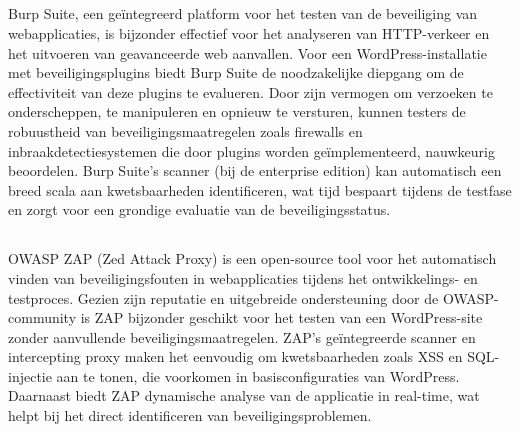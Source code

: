 \subsection{}
Burp Suite, een geïntegreerd platform voor het testen van de beveiliging van webapplicaties, is 
bijzonder effectief voor het analyseren van HTTP-verkeer en het uitvoeren van geavanceerde web 
aanvallen. Voor een WordPress-installatie met beveiligingsplugins biedt Burp Suite de noodzakelijke 
diepgang om de effectiviteit van deze plugins te evalueren. Door zijn vermogen om verzoeken te 
onderscheppen, te manipuleren en opnieuw te versturen, kunnen testers de robuustheid van 
beveiligingsmaatregelen zoals firewalls en inbraakdetectiesystemen die door plugins worden 
geïmplementeerd, nauwkeurig beoordelen. Burp Suite's scanner (bij de enterprise edition) kan automatisch een breed scala 
aan kwetsbaarheden identificeren, wat tijd bespaart tijdens de testfase en zorgt voor een 
grondige evaluatie van de beveiligingsstatus.

\subsection{}
OWASP ZAP (Zed Attack Proxy) is een open-source tool voor het automatisch vinden van beveiligingsfouten 
in webapplicaties tijdens het ontwikkelings- en testproces. Gezien zijn reputatie en uitgebreide 
ondersteuning door de OWASP-community is ZAP bijzonder geschikt voor het testen van een 
WordPress-site zonder aanvullende beveiligingsmaatregelen. ZAP's geïntegreerde scanner en 
intercepting proxy maken het eenvoudig om kwetsbaarheden zoals XSS en SQL-injectie aan te 
tonen, die voorkomen in basisconfiguraties van WordPress. Daarnaast biedt ZAP dynamische 
analyse van de applicatie in real-time, wat helpt bij het direct identificeren van beveiligingsproblemen.


\section{}


